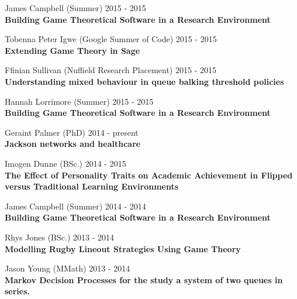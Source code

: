 \documentclass[10pt]{res} %
\begin{document}
\begin{resume}
\begin{etaremune}
\item
    James Campbell (Summer) \hfill 2015 -
    2015\\
\textbf{Building Game Theoretical Software in a Research Environment}\\

\item
    Tobenna Peter Igwe (Google Summer of Code) \hfill 2015 -
    2015\\
\textbf{Extending Game Theory in Sage}\\

\item
    Ffinian Sullivan (Nuffield Research Placement) \hfill 2015 -
    2015\\
\textbf{Understanding mixed behaviour in queue balking threshold policies}\\

\item
    Hannah Lorrimore (Summer) \hfill 2015 -
    2015\\
\textbf{Building Game Theoretical Software in a Research Environment}\\

\item
    Geraint Palmer (PhD) \hfill 2014 -
    present\\
\textbf{Jackson networks and healthcare}\\

\item
    Imogen Dunne (BSc.) \hfill 2014 -
    2015\\
\textbf{The Effect of Personality Traits on Academic Achievement in Flipped versus Traditional Learning Environments}\\

\item
    James Campbell (Summer) \hfill 2014 -
    2014\\
\textbf{Building Game Theoretical Software in a Research Environment}\\

\item
    Rhys Jones (BSc.) \hfill 2013 -
    2014\\
\textbf{Modelling Rugby Lineout Strategies Using Game Theory}\\

\item
    Jason Young (MMath) \hfill 2013 -
    2014\\
\textbf{Markov Decision Processes for the study a system of two queues in series.}\\


\end{etaremune}
\end{resume}
\end{document}
